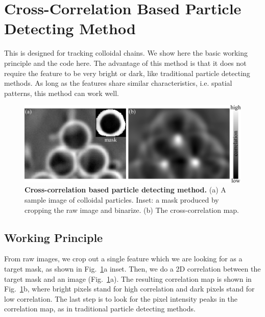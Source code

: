 \section{Cross-Correlation Based Particle Detecting Method}
\label{sec:A-cross-correlation-tracking-method}
This is designed for tracking colloidal chains. We show here the basic working principle and the code here. The advantage of this method is that it does not require the feature to be very bright or dark, like traditional particle detecting methods. As long as the features share similar characteristics, i.e. spatial patterns, this method can work well.

\begin{figure}[h]
	\begin{center}
	\includegraphics[width=5.5in]{Figs/A-2/corrTrack.pdf}
	\end{center}
	\caption[Cross-correlation based particle detecting method]
	{
	\textbf{Cross-correlation based particle detecting method.}
  (a) A sample image of colloidal particles. Inset: a mask produced by cropping the raw image and binarize.
  (b) The cross-correlation map.
	}
	\label{fig:corr-track}
\end{figure}

\subsection{Working Principle}
From raw images, we crop out a single feature which we are looking for as a target mask, as shown in Fig.~\ref{fig:corr-track}a inset. Then, we do a 2D correlation between the target mask and an image (Fig.~\ref{fig:corr-track}a). The resulting correlation map is shown in Fig.~\ref{fig:corr-track}b, where bright pixels stand for high correlation and dark pixels stand for low correlation. The last step is to look for the pixel intensity peaks in the correlation map, as in traditional particle detecting methods.



